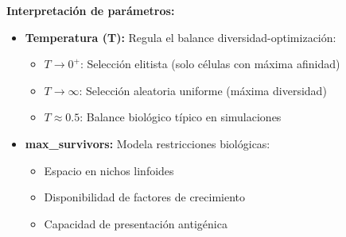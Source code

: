 \noindent \textbf{Interpretación de parámetros:}
\begin{itemize}
    \item \textbf{Temperatura (T):} Regula el balance diversidad-optimización:
    \begin{itemize}
        \item $T \to 0^+$: Selección elitista (solo células con máxima afinidad)
        \item $T \to \infty$: Selección aleatoria uniforme (máxima diversidad)
        \item $T \approx 0.5$: Balance biológico típico en simulaciones
    \end{itemize}
    
    \item \textbf{max\_survivors:} Modela restricciones biológicas:
    \begin{itemize}
        \item Espacio en nichos linfoides
        \item Disponibilidad de factores de crecimiento
        \item Capacidad de presentación antigénica
    \end{itemize}
\end{itemize}


